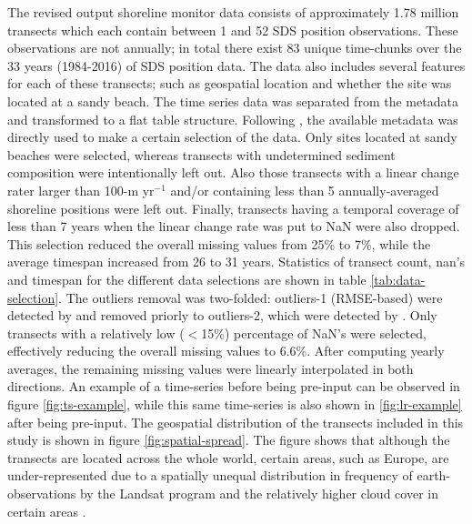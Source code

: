 \documentclass[format=sigconf, review=false, screen=true]{acmart}
\begin{document}
The revised output shoreline monitor data consists of approximately 1.78 million transects which each contain between 1 and 52 SDS position observations. These observations are not annually; in total there exist 83 unique time-chunks over the 33 years (1984-2016) of SDS position data. The data also includes several features for each of these transects; such as geospatial location and whether the site was located at a sandy beach. The time series data was separated from the metadata and transformed to a flat table structure. Following \citet{Kras2019shoreline}, the available metadata was directly used to make a certain selection of the data. Only sites located at sandy beaches were selected, whereas transects with undetermined sediment composition were intentionally left out. Also those transects with a linear change rater larger than 100-m yr$^{-1}$ and/or containing less than 5 annually-averaged shoreline positions were left out. Finally, transects having a temporal coverage of less than 7 years when the linear change rate was put to NaN were also dropped. This selection reduced the overall missing values from 25\% to 7\%, while the average timespan increased from 26 to 31 years. Statistics of transect count, nan's and timespan for the different data selections are shown in table \ref{tab:data-selection}. The outliers removal was two-folded: outliers-1 (RMSE-based) were detected by \citet{Luijendijk2018state} and removed priorly to outliers-2, which were detected by \citet{Kras2019shoreline}. Only transects with a relatively low ($<$15\%) percentage of NaN's were selected, effectively reducing the overall missing values to 6.6\%. After computing yearly averages, the remaining missing values were linearly interpolated in both directions. An example of a time-series before being pre-input can be observed in figure \ref{fig:ts-example}, while this same time-series is also shown in \ref{fig:lr-example} after being pre-input. The geospatial distribution of the transects included in this study is shown in figure \ref{fig:spatial-spread}. The figure shows that although the transects are located across the whole world, certain areas, such as Europe, are under-represented due to a spatially unequal distribution in frequency of earth-observations by the Landsat program \citep{wulder2016global} and the relatively higher cloud cover in certain areas \citep{garcia2008spatial}.
\end{document}
